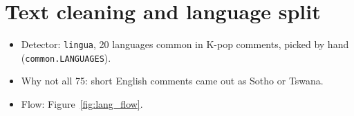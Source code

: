 \documentclass[11pt]{article}
\makeatletter
\newcommand{\gentable}[1]{\@@input #1 }
\makeatother
\begin{document}
% 
% 
% 

\section{Text cleaning and language split}

\begin{itemize}
  \item Detector: \texttt{lingua}, 20 languages common in K-pop comments, picked by hand (\texttt{common.LANGUAGES}).
  \item Why not all 75: short English comments came out as Sotho or Tswana.
  \item Flow: Figure~\ref{fig:lang_flow}.
\end{itemize}
\end{document}
